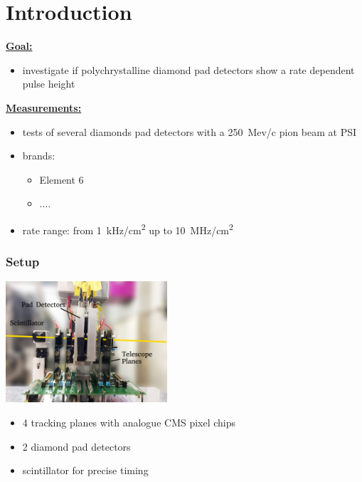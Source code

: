 \documentclass[9pt]{beamer}
\begin{document}
\section{Introduction}
\begin{frame}
	\underline{\textbf{Goal:}}
	\begin{itemize}
		\item investigate if polychrystalline diamond pad detectors show a rate dependent pulse height
	\end{itemize}
	\vspace*{1cm}
	\underline{\textbf{Measurements:}}
	\begin{itemize}
		\setlength{\itemsep}{\fill}
		\item tests of several diamonds pad detectors with a \SI{250}{Mev/c} pion beam at PSI
		\item brands:
		\begin{itemize}
			\item Element 6
			\item .$\hdots$
		\end{itemize}
		\item rate range: from \SI{1}{kHz/cm^{2}} up to \SI{10}{MHz/cm^{2}}
	\end{itemize}
\end{frame}
\begin{frame}
	\frametitle{Setup}
	\begin{center}
		\includegraphics[width=6cm]{Setup}
	\end{center}
	\begin{itemize}
		\setlength{\itemsep}{\fill}
		\item 4 tracking planes with analogue CMS pixel chips
		\item 2 diamond pad detectors
		\item scintillator for precise timing
	\end{itemize}
\end{frame}
\end{document}
